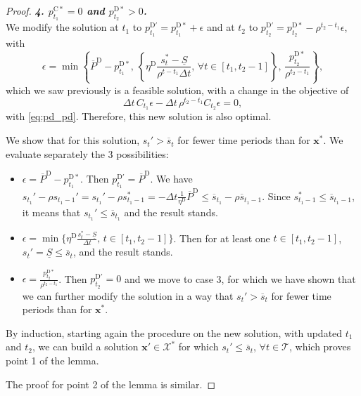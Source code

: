 \documentclass[10pt,a4paper]{amsart}
\newcommand{\up}[1]{^{\mathrm{#1}}}
\begin{document}
\begin{proof}
    \textit{\textbf{4. $p_{t_1}\up{C*}=0$ and $p_{t_2}\up{D*}>0$.}} \\
    We modify the solution at $t_1$ to ${p}\up{D'}_{t_1}={p}\up{D*}_{t_1}+{\epsilon}$ and at $t_2$ to ${p}\up{D'}_{t_2}={p}\up{D*}_{t_2}-\rho^{t_2 - t_1} \epsilon$, with
        \begin{equation} \label{eq:epsilon_4}
            \epsilon = \min \left\{\overline{P}\up{D} - {p}\up{D*}_{t_1}, \, \left\{ \eta\up{D} \frac{{s}_t^* - \underline{S}}{\rho^{t - t_1} \Delta t}, \, \forall t \in [t_1,t_2-1] \right\} , \, \frac{p\up{D*}_{t_2}}{\rho^{t_2 - t_1}} \right\},
        \end{equation}
        which we saw previously is a feasible solution, with a change in the objective of
        \begin{equation}
            \Delta t \, C_{t_1} \epsilon - \Delta t \, \rho^{t_2 - t_1} C_{t_2} \epsilon = 0,
        \end{equation}
        with \eqref{eq:pd_pd}. Therefore, this new solution is also optimal.
        
        We show that for this solution, $s_t' > \overline{s}_t$ for fewer time periods than for $\mathbf{x}^*$.
        We evaluate separately the 3 possibilities:
        \begin{itemize}
            \item ${\epsilon} = \overline{P}\up{D} - {p}\up{D*}_{t_1}$. Then $p\up{D'}_{t_1} = \overline{P}\up{D}$. We have $s_{t_1}'- \rho s_{t_1-1}' = s_{t_1}' - \rho s_{t_1-1}^* = - \Delta t \frac{1}{\eta\up{D}} \overline{P}\up{D} \leq \overline{s}_{t_1} - \rho \overline{s}_{t_1-1}$. Since $s_{t_1-1}^* \leq \overline{s}_{t_1-1}$, it means that $s_{t_1}' \leq \overline{s}_{t_1}$ and the result stands.
            \item ${\epsilon} = \min \{ \eta\up{D} \frac{{s}_t^* - \underline{S}}{\Delta t}, \, t \in [t_1, t_2-1] \}$. Then for at least one $t \in [t_1, t_2-1]$, $s_t'= \underline{S} \leq \overline{s}_t$, and the result stands.
            \item ${\epsilon} = \frac{p\up{D*}_{t_2}}{\rho^{t_2 - t_1}}$. Then ${p}\up{D'}_{t_2} = 0$ and we move to case 3, for which we have shown that we can further modify the solution in a way that $s_t' > \overline{s}_t$ for fewer time periods than for $\mathbf{x}^*$.
        \end{itemize}

    By induction, starting again the procedure on the new solution, with updated $t_1$ and $t_2$, we can build a solution $\mathbf{x}' \in \mathcal{X}^*$ for which $s_t' \leq \overline{s}_t$, $\forall t \in \mathcal{T}$, which proves point 1 of the lemma.
    
    The proof for point 2 of the lemma is similar.
\end{proof}
\end{document}
